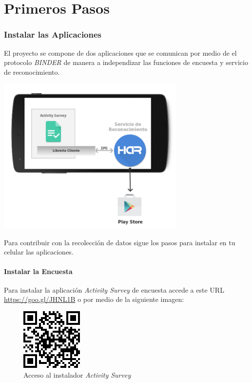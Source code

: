 \begin{table}[!htbp]
\begin{tabular}{lll}
\\
\end{tabular}
\end{table}

\section{Primeros Pasos}
\label{first:har-first}\label{first::doc}\label{first:primeros-pasos}

\subsubsection{Instalar las Aplicaciones}
\label{first:instalar-las-aplicaciones}
El proyecto se compone de dos aplicaciones \emph{} que se comunican por medio de el protocolo \emph{BINDER}  de manera a
independizar las funciones de encuesta y servicio de reconocimiento.


\includegraphics[width=0.7\textwidth]{anexos/graphics/archi_ipc.png}

Para contribuir con la recolección de datos sigue los pasos para instalar en tu celular las aplicaciones.

\paragraph{Instalar la Encuesta}
\label{first:instalar-la-encuesta}\label{first:har-survey}
Para instalar la aplicación \emph{Activity Survey} de encuesta accede a este URL \url{https://goo.gl/JHNL1B} o por medio de la siguiente
imagen:
\begin{figure}[!htbp]
   \centering
   \includegraphics{anexos/graphics/qr_url.jpg}
\caption{Acceso al instalador \emph{Activity Survey}}\label{first:id1}\end{figure}

